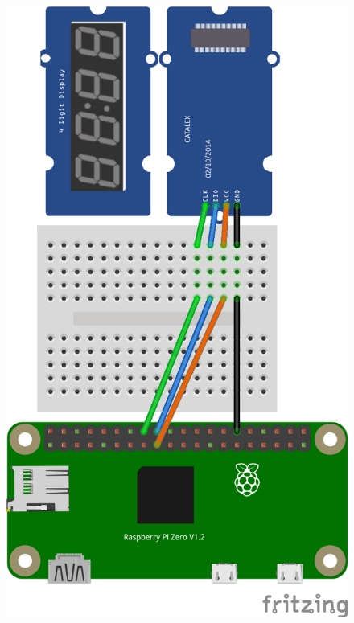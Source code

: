 

\begin{figure}[ht]
  \centering
  \includegraphics[scale=0.25, angle=-90]{images/TM1637_Steckplatine.png}	
  \label{TM1637}
\end{figure}

